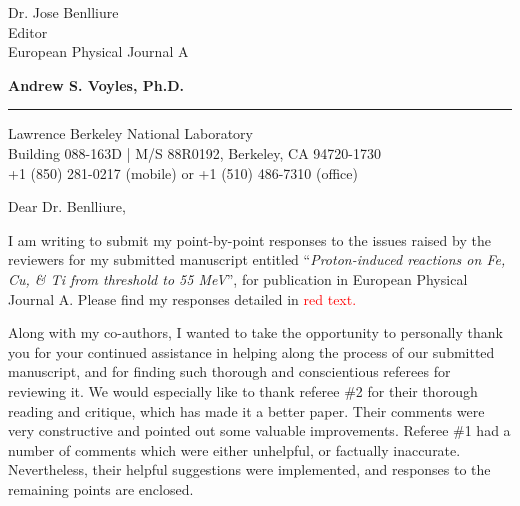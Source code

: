 \documentclass{letter} %
\newcommand{\colornote}[1]{\textcolor{red}{#1}}
\begin{document}
\signature{Andrew S. Voyles}           %
\longindentation=0pt                       %
\let\raggedleft\raggedright                %

 
 
\begin{letter}{Dr. Jose Benlliure \\
Editor \\
European Physical Journal A}


\begin{flushleft}
{\large\bf Andrew S. Voyles, Ph.D.}
\end{flushleft}
\medskip\hrule height 1pt
\begin{flushright}
\hfill Lawrence Berkeley National Laboratory \\
\hfill Building 088-163D  |  M/S 88R0192, Berkeley, CA  94720-1730 \\
\hfill  +1 (850) 281-0217 (mobile) or +1 (510) 486-7310 (office) 
\end{flushright} 
\vfill %

 
\opening{Dear Dr. Benlliure,} 

  \renewcommand*{\thefootnote}{\alph{footnote}}

  \noindent I am writing to submit my point-by-point responses to the issues raised by the reviewers for my submitted manuscript entitled \enquote{\emph{Proton-induced reactions on Fe, Cu, \& Ti from threshold to 55 MeV}},  for publication in European Physical Journal A.  Please find my responses detailed in \colornote{red text.}
  
  \noindent Along with my co-authors, I wanted to take the opportunity to personally thank you for your continued assistance in helping along the process of our submitted manuscript, and for finding such thorough and conscientious referees for reviewing it.  We would especially like to thank  referee \#2 for their thorough reading and critique, which has made it a better paper. Their comments were very constructive and pointed out some valuable improvements. Referee \#1 had a number of comments which were either unhelpful, or factually inaccurate.  Nevertheless, their helpful suggestions were implemented, and responses to the remaining points are enclosed. 
  

\end{letter}
\end{document}
